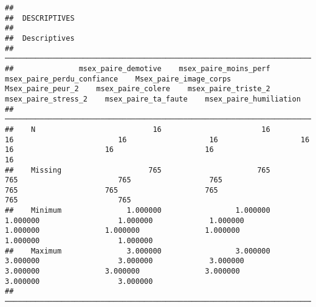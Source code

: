 \documentclass[
]{article}
\begin{document}
\begin{verbatim}
## 
##  DESCRIPTIVES
## 
##  Descriptives                                                                                                                                                                                                                                                 
##  ──────────────────────────────────────────────────────────────────────────────────────────────────────────────────────────────────────────────────────────────────────────────────────────────────────────────────────────────────────────────────────────── 
##               msex_paire_demotive    msex_paire_moins_perf    msex_paire_perdu_confiance    Msex_paire_image_corps    Msex_paire_peur_2    msex_paire_colere    msex_paire_triste_2    msex_paire_stress_2    msex_paire_ta_faute    msex_paire_humiliation   
##  ──────────────────────────────────────────────────────────────────────────────────────────────────────────────────────────────────────────────────────────────────────────────────────────────────────────────────────────────────────────────────────────── 
##    N                           16                       16                            16                        16                   16                   16                     16                     16                     16                        16   
##    Missing                    765                      765                           765                       765                  765                  765                    765                    765                    765                       765   
##    Minimum               1.000000                 1.000000                      1.000000                  1.000000             1.000000             1.000000               1.000000               1.000000               1.000000                  1.000000   
##    Maximum               3.000000                 3.000000                      3.000000                  3.000000             3.000000             3.000000               3.000000               3.000000               3.000000                  3.000000   
##  ────────────────────────────────────────────────────────────────────────────────────────────────────────────────────────────────────────────────────────────────────────────────────────────────────────────────────────────────────────────────────────────
\end{verbatim}
\end{document}
